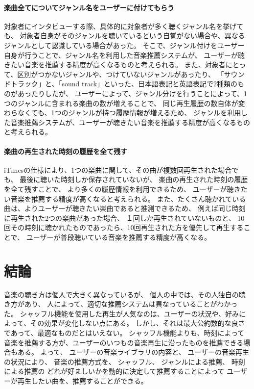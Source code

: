 \documentclass[a4paper, 11pt, onecolumn, report]{jsarticle}
\begin{document}
\paragraph{楽曲全てについてジャンル名をユーザーに付けてもらう}
対象者にインタビューする際、具体的に対象者が多く聴くジャンル名を挙げても、
対象者自身がそのジャンルを聴いているという自覚がない場合や、異なるジャンルとして認識している場合があった。
そこで、ジャンル付けをユーザー自身が行うことで、ジャンル名を利用した音楽推薦システムが、
ユーザーが聴きたい音楽を推薦する精度が高くなるものと考えられる。
また、対象者にとって、区別がつかないジャンルや、つけていないジャンルがあったり、
「サウンドトラック」と、「sound track」といった、日本語表記と英語表記で2種類のものがあったりしたが、
ユーザーによって、ジャンル分けを行うことによって、1つのジャンルに含まれる楽曲の数が増えることで、
同じ再生履歴の数自体が変わらなくても、1つのジャンルが持つ履歴情報が増えるため、
ジャンルを利用した音楽推薦システムが、ユーザーが聴きたい音楽を推薦する精度が高くなるものと考えられる。
\paragraph{楽曲の再生された時刻の履歴を全て残す}
iTunesの仕様により、1つの楽曲に関して、その曲が複数回再生された場合でも、
最後に聴いた時刻しか保存されていないが、
楽曲の再生された時刻の履歴を全て残すことで、
より多くの履歴情報を利用できるため、
ユーザーが聴きたい音楽を推薦する精度が高くなると考えられる。
また、たくさん聴かれている曲は、よりユーザーが聴きたい楽曲であると推測できるため、
例えば同じ時刻に再生された2つの楽曲があった場合、
１回しか再生されていないものと、
10回その時刻に聴かれたものであったら、10回再生された方を優先して再生することで、
ユーザーが普段聴いている音楽を推薦する精度が高くなる。



\section{結論}
音楽の聴き方は個人で大きく異なっているが、
個人の中では、その人独自の聴き方があり、
人によって、適切な推薦システムは異なっていることがわかった。
シャッフル機能を使用した再生が人気なのは、ユーザーの状況や、好みによって、その効果が変化しない点にある。
しかし、それは最大公約数的な良さであって、最適なものだとはいえない。
シャッフル機能よりも、時刻によって音楽を推薦する方が、ユーザーのいつもの音楽再生に沿ったものを推薦できる場合もある。
よって、
ユーザーの音楽ライブラリの内容と、
ユーザーの音楽再生の状況により、
音楽の推薦方式を、
シャッフル、
ジャンルによる推薦、
時刻による推薦の
どれが好ましいかを動的に決定して推薦することによって
ユーザーが再生したい曲を、推薦することができる。
\end{document}
